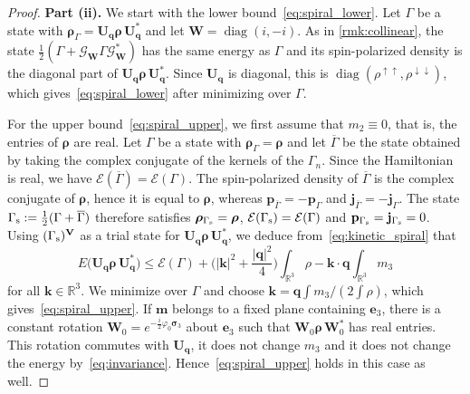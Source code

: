 \documentclass[final,reqno]{amsart}
\theoremstyle{remark}
\renewcommand{\le}{\leqslant}
\newcommand{\ol}[1]{\overline{#1}}
\newcommand{\spu}{\uparrow}
\newcommand{\spd}{\downarrow}
\DeclareMathOperator{\diag}{diag}
\newcommand{\RR}{\mathbb{R}}
\newcommand{\EC}{\mathcal{E}}
\newcommand{\GC}{\mathcal{G}}
\begin{document}
\begin{proof}
\medskip

\noindent\textbf{Part (ii).} We start with the lower bound~\cref{eq:spiral_lower}. Let $\Gamma$ be a state with $\bm{\rho}_\Gamma=\mathbf{U}_{\mathbf{q}}\bm{\rho}\,\mathbf{U}_{\mathbf{q}}^*$ and let $\mathbf{W}=\diag(i,-i)$. As in \cref{rmk:collinear}, the state $\frac12(\Gamma+\GC_{\mathbf{W}}\Gamma \GC_{\mathbf{W}}^*)$ has the same energy as $\Gamma$ and its spin-polarized density is the diagonal part of $\mathbf{U}_{\mathbf{q}}\bm{\rho}\,\mathbf{U}_{\mathbf{q}}^*$. Since $\mathbf{U}_{\mathbf{q}}$ is diagonal, this is $\diag(\rho^{\spu\spu},\rho^{\spd\spd})$, which gives~\cref{eq:spiral_lower} after minimizing over $\Gamma$.

For the upper bound~\cref{eq:spiral_upper}, we first assume that $m_2\equiv0$, that is, the entries of $\bm{\rho}$ are real. Let $\Gamma$ be a state with $\bm{\rho}_\Gamma=\bm{\rho}$ and let $\ol\Gamma$ be the state obtained by taking the complex conjugate of the kernels of the $\Gamma_n$. Since the Hamiltonian is real, we have $\EC(\ol\Gamma)=\EC(\Gamma)$. The spin-polarized density of $\ol\Gamma$ is the complex conjugate of $\bm{\rho}$, hence it is equal to $\bm{\rho}$, whereas $\mathbf{p}_{\ol\Gamma}=-\mathbf{p}_\Gamma$ and $\mathbf{j}_{\ol\Gamma}=-\mathbf{j}_\Gamma$. The state $\Gamma_{\rm s}:=\frac12(\Gamma+\ol\Gamma)$ therefore satisfies $\bm{\rho}_{\Gamma_{\rm s}}=\bm{\rho}$, $\EC(\Gamma_{\rm s})=\EC(\Gamma)$ and $\mathbf{p}_{\Gamma_{\rm s}}=\mathbf{j}_{\Gamma_{\rm s}}=0$. Using $(\Gamma_{\rm s})^{\mathbf{V}}$ as a trial state for $\mathbf{U}_{\mathbf{q}}\bm{\rho}\,\mathbf{U}_{\mathbf{q}}^*$, we deduce from~\cref{eq:kinetic_spiral} that
$$
E\big(\mathbf{U}_{\mathbf{q}}\bm{\rho}\,\mathbf{U}_{\mathbf{q}}^*\big)\le \EC(\Gamma)+\Big(|\mathbf{k}|^2+\frac{|\mathbf{q}|^2}4\Big)\int_{\RR^3}\rho-\mathbf{k}\cdot\mathbf{q}\int_{\RR^3}m_3
$$
for all $\mathbf{k}\in\RR^3$. We minimize over $\Gamma$ and choose $\mathbf{k}=\mathbf{q}\int m_3/(2\int\rho)$, which gives~\cref{eq:spiral_upper}. If $\mathbf{m}$ belongs to a fixed plane containing $\mathbf{e}_3$, there is a constant rotation $\mathbf{W}_0=e^{-\frac i2\varphi_0\bm{\sigma}_3}$ about $\mathbf{e}_3$ such that $\mathbf{W}_0\bm{\rho}\,\mathbf{W}_0^*$ has real entries. This rotation commutes with $\mathbf{U}_{\mathbf{q}}$, it does not change $m_3$ and it does not change the energy by~\cref{eq:invariance}. Hence~\cref{eq:spiral_upper} holds in this case as well.

\medskip


\end{proof}
\end{document}
